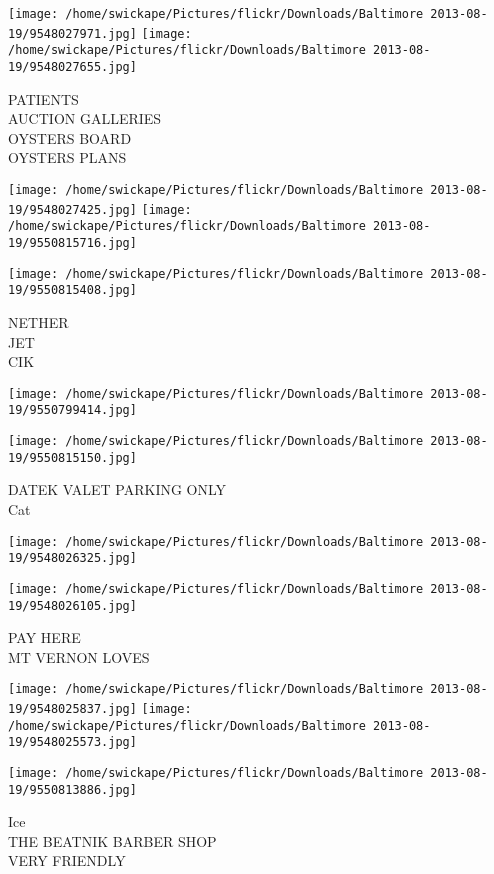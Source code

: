\documentclass[10pt,letterpaper]{article}
\begin{document}
\texttt{[image: /home/swickape/Pictures/flickr/Downloads/Baltimore 2013-08-19/9548027971.jpg]}
\texttt{[image: /home/swickape/Pictures/flickr/Downloads/Baltimore 2013-08-19/9548027655.jpg]}

PATIENTS\\
AUCTION GALLERIES\\
OYSTERS BOARD\\
OYSTERS PLANS
\pagebreak

\texttt{[image: /home/swickape/Pictures/flickr/Downloads/Baltimore 2013-08-19/9548027425.jpg]}
\texttt{[image: /home/swickape/Pictures/flickr/Downloads/Baltimore 2013-08-19/9550815716.jpg]}

\texttt{[image: /home/swickape/Pictures/flickr/Downloads/Baltimore 2013-08-19/9550815408.jpg]}

NETHER\\
JET\\
CIK
\pagebreak

\texttt{[image: /home/swickape/Pictures/flickr/Downloads/Baltimore 2013-08-19/9550799414.jpg]}

\vspace{0.25in}
\texttt{[image: /home/swickape/Pictures/flickr/Downloads/Baltimore 2013-08-19/9550815150.jpg]}

DATEK VALET PARKING ONLY\\
Cat
\pagebreak

\texttt{[image: /home/swickape/Pictures/flickr/Downloads/Baltimore 2013-08-19/9548026325.jpg]}

\vspace{0.25in}
\texttt{[image: /home/swickape/Pictures/flickr/Downloads/Baltimore 2013-08-19/9548026105.jpg]}

PAY HERE\\
MT VERNON LOVES
\pagebreak

\texttt{[image: /home/swickape/Pictures/flickr/Downloads/Baltimore 2013-08-19/9548025837.jpg]}
\texttt{[image: /home/swickape/Pictures/flickr/Downloads/Baltimore 2013-08-19/9548025573.jpg]}

\texttt{[image: /home/swickape/Pictures/flickr/Downloads/Baltimore 2013-08-19/9550813886.jpg]}

Ice\\
THE BEATNIK BARBER SHOP\\
VERY FRIENDLY
\pagebreak
\end{document}
